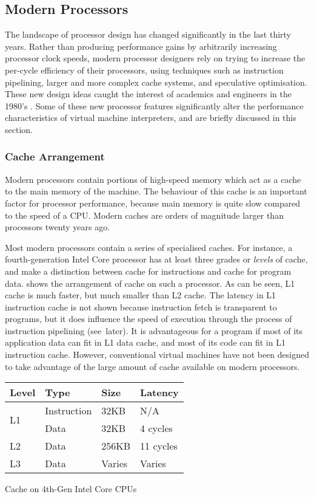 			
		\subsection{Modern Processors}
			The landscape of processor design has changed significantly in the last thirty years. Rather than producing performance gains by arbitrarily increasing processor clock speeds, modern processor designers rely on trying to increase the per-cycle efficiency of their processors, using techniques such as instruction pipelining, larger and more complex cache systems, and speculative optimisation. These new design ideas caught the interest of academics and engineers in the 1980's \citep{modernprocessordesign}. Some of these new processor features significantly alter the performance characteristics of virtual machine interpreters, and are briefly discussed in this section.
			
			\subsubsection{Cache Arrangement}
			Modern processors contain portions of high-speed memory which act as a cache to the main memory of the machine. The behaviour of this cache is an important factor for processor performance, because main memory is quite slow compared to the speed of a CPU. Modern caches are orders of magnitude larger than processors twenty years ago. 
			
			Most modern processors contain a series of specialised caches. For instance, a fourth-generation Intel Core processor has at least three grades or \emph{levels} of cache, and make a distinction between cache for instructions and cache for program data.  shows the arrangement of cache on such a processor. As can be seen, L1 cache is much faster, but much smaller than L2 cache. The latency in L1 instruction cache is not shown because instruction fetch is transparent to programs, but it does influence the speed of execution through the process of instruction pipelining (see~later). It is advantageous for a program if most of its application data can fit in L1 data cache, and most of its code can fit in L1 instruction cache. However, conventional virtual machines have not been designed to take advantage of the large amount of cache available on modern processors.
			
			\begin{myfigure}
				\begin{tabular}{ | l | l | l | l | }
					\hline
					Level & Type & Size & Latency \\ 
					\hline
					\multirow{2}{*}{L1} & Instruction & 32KB & N/A \\
					& Data & 32KB & 4 cycles \\
					\hline
					L2 & Data & 256KB & 11 cycles \\
					\hline
					L3 & Data & Varies & Varies \\
					\hline
				\end{tabular}
				\caption{Cache on 4th-Gen Intel Core CPUs \citep{optimisationreference}}
				\label{fig:cachenumbers}
			\end{myfigure}
			
